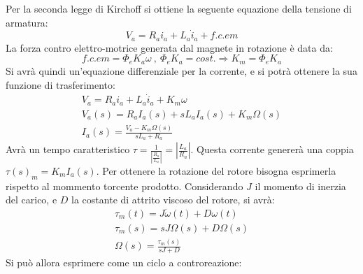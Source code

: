 \documentclass{article}
\numberwithin{equation}{subsection}
\begin{document}
Per la seconda legge di Kirchoff si ottiene la seguente equazione della tensione di armatura:
\begin{equation}
    V_a=R_ai_a+L_a\dot i_a+f.c.em 
\end{equation}
La forza contro elettro-motrice generata dal magnete in rotazione è data da:
\begin{equation}
    f.c.em=\Phi_eK_a\omega\:,\:\Phi_eK_a=cost.\Rightarrow K_m=\Phi_eK_a
\end{equation}
Si avrà quindi un'equazione differenziale per la corrente, e si potrà ottenere la sua funzione di trasferimento:
\begin{gather}
    V_a=R_ai_a+L_a\dot i_a+K_m\omega\\
    V_a(s)=R_aI_a(s)+sL_aI_a(s)+K_m\Omega(s)\\
    I_a(s)=\displaystyle\frac{V_a-K_m\Omega(s)}{sL_a+R_a}
\end{gather}
Avrà un tempo caratteristico $\tau=\displaystyle\frac{1}{\displaystyle\left|\frac{R_a}{L_a}\right|}=\left|\frac{L_a}{R_a}\right|$. Questa corrente genererà una coppia 
$\tau(s)_m=K_mI_a(s)$. 
Per ottenere la rotazione del rotore bisogna esprimerla rispetto al mommento torcente prodotto. Considerando $J$ il momento di inerzia del carico, e $D$ la costante 
di attrito viscoso del rotore, si avrà:
\begin{gather}
    \tau_m(t)=J\dot\omega(t)+D\omega(t)\\
    \tau_m(s)=sJ\Omega(s)+D\Omega(s)\\
    \Omega(s)=\displaystyle\frac{\tau_m(s)}{sJ+D}
\end{gather}
Si può allora esprimere come un ciclo a controreazione:
\end{document}
